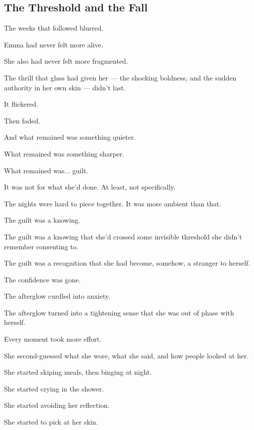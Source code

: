 
\subsection{The Threshold and the Fall}

The weeks that followed blurred.

Emma had never felt more alive.

She also had never felt more fragmented. 

The thrill that glass had given her --- the shocking 
boldness, and the sudden authority in her own skin --- didn’t last.  

It flickered. 

Then faded. 

And what remained was something quieter. 

What remained was something sharper.

What remained was... guilt.

It was not for what she’d done. At least, not specifically. 

The nights were hard to piece together. 
It was more ambient than that. 

The guilt was a knowing. 

The guilt was a knowing that she'd crossed some invisible threshold she didn’t 
remember consenting to. 

The guilt was a recognition that she had become, somehow, a stranger to herself.

The confidence was gone.

The afterglow curdled into anxiety. 

The afterglow turned into a tightening sense that she was 
out of phase with herself. 

Every moment took more effort. 

She second-guessed what she wore, what she said, and how people looked at her. 

She started skiping meals, then binging at night. 

She started crying in the shower. 

She started avoiding her reflection. 

She started to pick at her skin. 

\medskip

